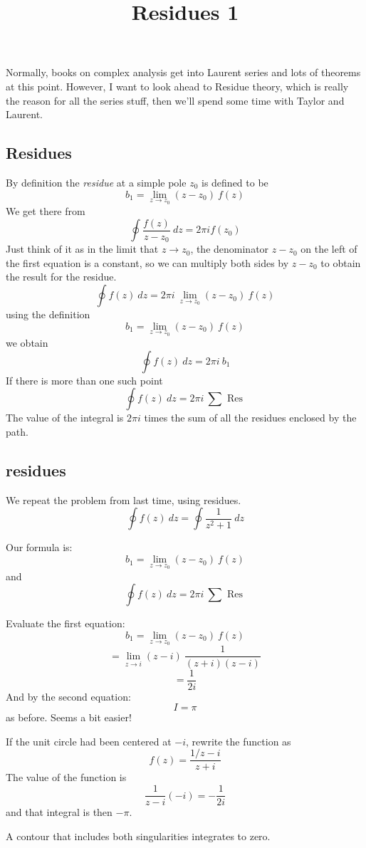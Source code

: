 \documentclass[11pt, oneside]{article}   	%
\title{Residues 1}
\date{}							%
\begin{document}
\maketitle
\Large
Normally, books on complex analysis get into Laurent series and lots of theorems at this point.  However, I want to look ahead to Residue theory, which is really the reason for all the series stuff, then we'll spend some time with Taylor and Laurent.

\subsection*{Residues}
By definition the \emph{residue} at a simple pole $z_0$ is defined to be
\[ b_1 = \lim_{z \rightarrow z_0} (z-z_0) \ f(z)  \]
We get there from 
\[  \oint \frac{f(z)}{z - z_0} \ dz = 2 \pi i f(z_0) \]
Just think of it as in the limit that $z \rightarrow z_0$, the denominator $z-z_0$ on the left of the first equation is a constant, so we can multiply both sides by $z - z_0$
to obtain the result for the residue.
\[ \oint f(z) \ dz = 2 \pi i \ \lim_{z \rightarrow z_0} (z-z_0) \ f(z)  \]
using the definition
\[ b_1 = \lim_{z \rightarrow z_0} (z-z_0) \ f(z)  \]
we obtain
\[ \oint f(z) \ dz = 2 \pi i \ b_1  \]
If there is more than one such point
\[ \oint f(z) \ dz = 2 \pi i \ \sum \text{ Res } \]
The value of the integral is $2 \pi i$ times the sum of all the residues enclosed by the path.

\subsection*{residues}
We repeat the problem from last time, using residues.  
\[ \oint f(z) \ dz = \oint \frac{1}{z^2 + 1} \ dz \]

Our formula is:
\[ b_1 = \lim_{z \rightarrow z_0} (z-z_0) \ f(z)  \]
and
\[ \oint f(z) \ dz = 2 \pi i \ \sum \text{ Res } \]

Evaluate the first equation:
\[ b_1 = \lim_{z \rightarrow z_0} (z-z_0) \ f(z)  \]
\[ = \lim_{z \rightarrow i} (z-i) \  \frac{1}{(z+i)(z-i)} \]
\[ = \frac{1}{2i} \]
And by the second equation:
\[ I = \pi \]
as before.  Seems a bit easier!

If the unit circle had been centered at $-i$, rewrite the function as
\[ f(z) = \frac{1/z-i}{z+i} \]
The value of the function is
\[ \frac{1}{z-i}(-i) = -\frac{1}{2i} \]
and that integral is then $- \pi$.

A contour that includes both singularities integrates to zero.
\end{document}
